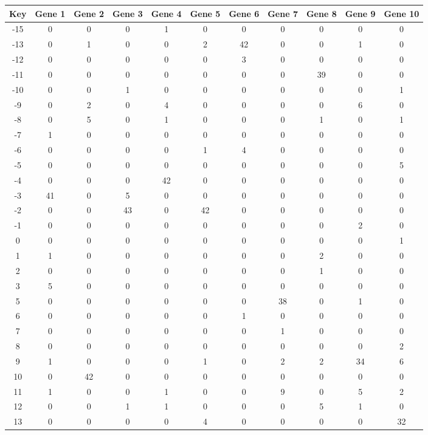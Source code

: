 \begin{tabular}{|c|c|c|c|c|c|c|c|c|c|c|}
\hline
Key & Gene 1 & Gene 2 & Gene 3 & Gene 4 & Gene 5 & Gene 6 & Gene 7 & Gene 8 & Gene 9 & Gene 10 \\
\hline
-15 & 0 & 0 & 0 & 1 & 0 & 0 & 0 & 0 & 0 & 0 \\
-13 & 0 & 1 & 0 & 0 & 2 & 42 & 0 & 0 & 1 & 0 \\
-12 & 0 & 0 & 0 & 0 & 0 & 3 & 0 & 0 & 0 & 0 \\
-11 & 0 & 0 & 0 & 0 & 0 & 0 & 0 & 39 & 0 & 0 \\
-10 & 0 & 0 & 1 & 0 & 0 & 0 & 0 & 0 & 0 & 1 \\
-9 & 0 & 2 & 0 & 4 & 0 & 0 & 0 & 0 & 6 & 0 \\
-8 & 0 & 5 & 0 & 1 & 0 & 0 & 0 & 1 & 0 & 1 \\
-7 & 1 & 0 & 0 & 0 & 0 & 0 & 0 & 0 & 0 & 0 \\
-6 & 0 & 0 & 0 & 0 & 1 & 4 & 0 & 0 & 0 & 0 \\
-5 & 0 & 0 & 0 & 0 & 0 & 0 & 0 & 0 & 0 & 5 \\
-4 & 0 & 0 & 0 & 42 & 0 & 0 & 0 & 0 & 0 & 0 \\
-3 & 41 & 0 & 5 & 0 & 0 & 0 & 0 & 0 & 0 & 0 \\
-2 & 0 & 0 & 43 & 0 & 42 & 0 & 0 & 0 & 0 & 0 \\
-1 & 0 & 0 & 0 & 0 & 0 & 0 & 0 & 0 & 2 & 0 \\
0 & 0 & 0 & 0 & 0 & 0 & 0 & 0 & 0 & 0 & 1 \\
1 & 1 & 0 & 0 & 0 & 0 & 0 & 0 & 2 & 0 & 0 \\
2 & 0 & 0 & 0 & 0 & 0 & 0 & 0 & 1 & 0 & 0 \\
3 & 5 & 0 & 0 & 0 & 0 & 0 & 0 & 0 & 0 & 0 \\
5 & 0 & 0 & 0 & 0 & 0 & 0 & 38 & 0 & 1 & 0 \\
6 & 0 & 0 & 0 & 0 & 0 & 1 & 0 & 0 & 0 & 0 \\
7 & 0 & 0 & 0 & 0 & 0 & 0 & 1 & 0 & 0 & 0 \\
8 & 0 & 0 & 0 & 0 & 0 & 0 & 0 & 0 & 0 & 2 \\
9 & 1 & 0 & 0 & 0 & 1 & 0 & 2 & 2 & 34 & 6 \\
10 & 0 & 42 & 0 & 0 & 0 & 0 & 0 & 0 & 0 & 0 \\
11 & 1 & 0 & 0 & 1 & 0 & 0 & 9 & 0 & 5 & 2 \\
12 & 0 & 0 & 1 & 1 & 0 & 0 & 0 & 5 & 1 & 0 \\
13 & 0 & 0 & 0 & 0 & 4 & 0 & 0 & 0 & 0 & 32 \\
\hline
\end{tabular}